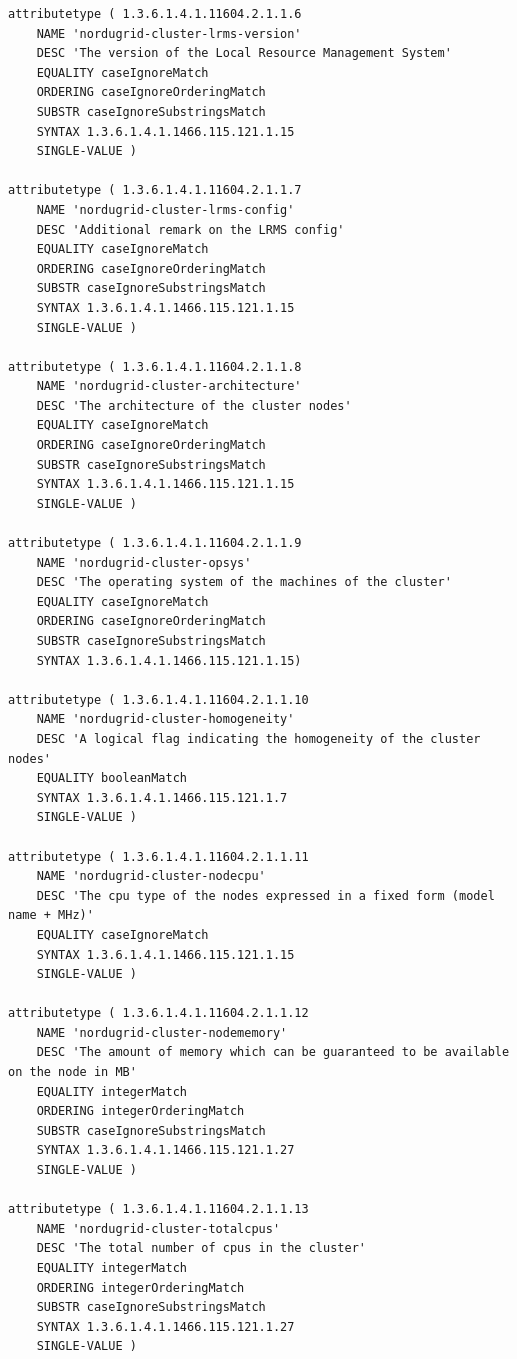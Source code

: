 \documentclass{article}
\begin{document}
\begin{verbatim}
attributetype ( 1.3.6.1.4.1.11604.2.1.1.6
    NAME 'nordugrid-cluster-lrms-version'
    DESC 'The version of the Local Resource Management System'
    EQUALITY caseIgnoreMatch
    ORDERING caseIgnoreOrderingMatch
    SUBSTR caseIgnoreSubstringsMatch
    SYNTAX 1.3.6.1.4.1.1466.115.121.1.15
    SINGLE-VALUE )

attributetype ( 1.3.6.1.4.1.11604.2.1.1.7
    NAME 'nordugrid-cluster-lrms-config'
    DESC 'Additional remark on the LRMS config'
    EQUALITY caseIgnoreMatch
    ORDERING caseIgnoreOrderingMatch
    SUBSTR caseIgnoreSubstringsMatch
    SYNTAX 1.3.6.1.4.1.1466.115.121.1.15
    SINGLE-VALUE )

attributetype ( 1.3.6.1.4.1.11604.2.1.1.8
    NAME 'nordugrid-cluster-architecture'
    DESC 'The architecture of the cluster nodes'
    EQUALITY caseIgnoreMatch
    ORDERING caseIgnoreOrderingMatch
    SUBSTR caseIgnoreSubstringsMatch
    SYNTAX 1.3.6.1.4.1.1466.115.121.1.15
    SINGLE-VALUE )

attributetype ( 1.3.6.1.4.1.11604.2.1.1.9
    NAME 'nordugrid-cluster-opsys'
    DESC 'The operating system of the machines of the cluster'
    EQUALITY caseIgnoreMatch
    ORDERING caseIgnoreOrderingMatch
    SUBSTR caseIgnoreSubstringsMatch
    SYNTAX 1.3.6.1.4.1.1466.115.121.1.15)
  
attributetype ( 1.3.6.1.4.1.11604.2.1.1.10
    NAME 'nordugrid-cluster-homogeneity'
    DESC 'A logical flag indicating the homogeneity of the cluster nodes'
    EQUALITY booleanMatch
    SYNTAX 1.3.6.1.4.1.1466.115.121.1.7
    SINGLE-VALUE )   

attributetype ( 1.3.6.1.4.1.11604.2.1.1.11
    NAME 'nordugrid-cluster-nodecpu'
    DESC 'The cpu type of the nodes expressed in a fixed form (model name + MHz)'
    EQUALITY caseIgnoreMatch
    SYNTAX 1.3.6.1.4.1.1466.115.121.1.15
    SINGLE-VALUE )

attributetype ( 1.3.6.1.4.1.11604.2.1.1.12
    NAME 'nordugrid-cluster-nodememory'
    DESC 'The amount of memory which can be guaranteed to be available on the node in MB'
    EQUALITY integerMatch
    ORDERING integerOrderingMatch
    SUBSTR caseIgnoreSubstringsMatch
    SYNTAX 1.3.6.1.4.1.1466.115.121.1.27
    SINGLE-VALUE )

attributetype ( 1.3.6.1.4.1.11604.2.1.1.13
    NAME 'nordugrid-cluster-totalcpus'
    DESC 'The total number of cpus in the cluster'
    EQUALITY integerMatch
    ORDERING integerOrderingMatch
    SUBSTR caseIgnoreSubstringsMatch
    SYNTAX 1.3.6.1.4.1.1466.115.121.1.27
    SINGLE-VALUE ) 


\end{verbatim}
\end{document}
